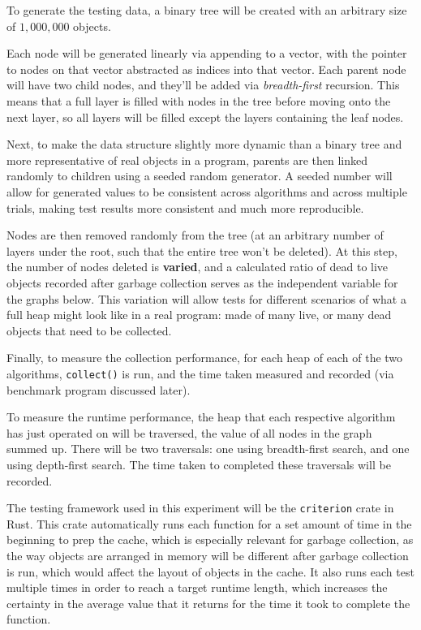 \documentclass[index]{subfiles}
\begin{document}
To generate the testing data, a binary tree will be created with an arbitrary size of \(1,000,000\) objects.

Each node will be generated linearly via appending to a vector, with the pointer to nodes on that vector abstracted as indices into that vector. Each parent node will have two child nodes, and they'll be added via \textit{breadth-first} recursion. This means that a full layer is filled with nodes in the tree before moving onto the next layer, so all layers will be filled except the layers containing the leaf nodes.

Next, to make the data structure slightly more dynamic than a binary tree and more representative of real objects in a program, parents are then linked randomly to children using a seeded random generator. A seeded number will allow for generated values to be consistent across algorithms and across multiple trials, making test results more consistent and much more reproducible.

Nodes are then removed randomly from the tree (at an arbitrary number of layers under the root, such that the entire tree won't be deleted). At this step, the number of nodes deleted is \textbf{varied}, and a calculated ratio of dead to live objects recorded after garbage collection serves as the independent variable for the graphs below. This variation will allow tests for different scenarios of what a full heap might look like in a real program: made of many live, or many dead objects that need to be collected.

Finally, to measure the collection performance, for each heap of each of the two algorithms, \verb+collect()+ is run, and the time taken measured and recorded (via benchmark program discussed later).

To measure the runtime performance, the heap that each respective algorithm has just operated on will be traversed, the value of all nodes in the graph summed up. There will be two traversals: one using breadth-first search, and one using depth-first search. The time taken to completed these traversals will be recorded.

The testing framework used in this experiment will be the \verb+criterion+ crate in Rust. This crate automatically runs each function for a set amount of time in the beginning to prep the cache\cite{brookheislerAnalysisProcessCriterion}, which is especially relevant for garbage collection, as the way objects are arranged in memory will be different after garbage collection is run, which would affect the layout of objects in the cache. It also runs each test multiple times in order to reach a target runtime length, which increases the certainty in the average value that it returns for the time it took to complete the function\cite{brookheislerAnalysisProcessCriterion}.
\end{document}
